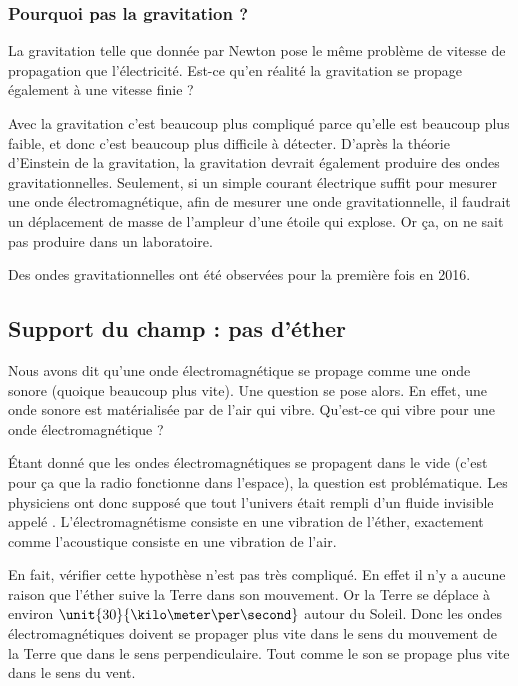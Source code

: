 \subsubsection{Pourquoi pas la gravitation ?}

La gravitation telle que donnée par Newton pose le même problème de vitesse de propagation que l'électricité. Est-ce qu'en réalité la gravitation se propage également à une vitesse finie ?

Avec la gravitation c'est beaucoup plus compliqué parce qu'elle est beaucoup plus faible, et donc c'est beaucoup plus difficile à détecter. D'après la théorie d'Einstein de la gravitation, la gravitation devrait également produire des ondes gravitationnelles. Seulement, si un simple courant électrique suffit pour mesurer une onde électromagnétique, afin de mesurer une onde gravitationnelle, il faudrait un déplacement de masse de l'ampleur d'une étoile qui explose. Or ça, on ne sait pas produire dans un laboratoire.

Des ondes gravitationnelles ont été observées pour la première fois en 2016\cite{BIBooAZZPooQvHWLV}.


\subsection{Support du champ : pas d'éther}

Nous avons dit qu'une onde électromagnétique se propage comme une onde sonore (quoique beaucoup plus vite). Une question se pose alors. En effet, une onde sonore est matérialisée par de l'air qui vibre. Qu'est-ce qui vibre pour une onde électromagnétique ?

Étant donné que les ondes électromagnétiques se propagent dans le vide (c'est pour ça que la radio fonctionne dans l'espace), la question est problématique. Les physiciens ont donc supposé que tout l'univers était rempli d'un fluide invisible appelé . L'électromagnétisme consiste en une vibration de l'éther, exactement comme l'acoustique consiste en une vibration de l'air.

En fait, vérifier cette hypothèse n'est pas très compliqué. En effet il n'y a aucune raison que l'éther suive la Terre dans son mouvement. Or la Terre se déplace à environ \( \unit{30}{\kilo\meter\per\second}\) autour du Soleil. Donc les ondes électromagnétiques doivent se propager plus vite dans le sens du mouvement de la Terre que dans le sens perpendiculaire. Tout comme le son se propage plus vite dans le sens du vent.

